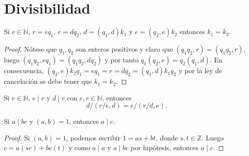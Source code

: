 \newpage
\appendix
\section{Divisibilidad}

\begin{proposition}
Si $r \in \mathbb{N}$, $r=e q_1$, $r= d q_2$, $d=(q_1,d)k_1$ y $e=(q_2,e) k_2$ entonces $k_1=k_2$.
\end{proposition}
\begin{proof}
Nótese que $q_1,q_2$ son enteros positivos y claro que $(q_1 q_2, r) = (q_1 q_2, r)$, luego $(q_1 q_2,e q_1)=(q_1 q_2,d q_2)$ y por tanto $q_1 (q_2,e)=q_2 (q_1,d)$. En consecuencia, $(q_2,e)k_2 q_1 = e q_1 = r = d q_2 = (q_1,d)k_1 q_2$ y por la ley de cancelación se debe tener que $k_1 = k_2$.
\end{proof}

\begin{corollary}\label{cor:mcd1}
Si $r \in \mathbb{N}$, $e \mid r$ y $d \mid r$ con $e,r \in \mathbb{N}$, entonces
\begin{equation*}
    d/\left( r/e,d \right) = e/\left( r/d,e \right).
\end{equation*}
\end{corollary}

\begin{theorem}
Si $a \mid bc$ y $(a,b)=1$, entonces $a \mid c$.
\end{theorem}
\begin{proof}
Si $(a,b)=1$, podemos escribir $1=a s+b t$, donde $s,t\in \mathbb{Z}$. Luego $c=a(s c)+b c(t)$ y como $a \mid a$ y $a \mid bc$ por hipótesis, entonces $a \mid c$.
\end{proof}
